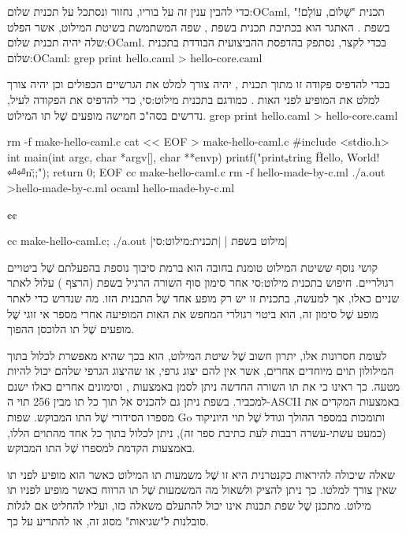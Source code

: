 \begin{טבלא}[!htbp]
כדי להבין ענין זה על בוריו, נחזור ונסתכל על  תכנית שלום:OCaml, תכנית
"שָׁלוֹם, עוֹלָם!" בשפת . האתגר הוא בכתיבת תכנית בשפת , שפה המשתמשת
בשיטת המילוט, אשר הפלט שלה יהיה  תכנית שלום:OCaml. בכדי לקצר, נסתפק בהדפסת
ה הביצועית הבודדת ב תכנית שלום:OCaml{}:
\bash
grep print hello.caml > hello-core.caml
\END
{}
\setLTR
\lstset{language=[Objective]Caml,style=display}

בכדי להדפיס פקודה זו מתוך תכנית , יהיה צורך למלט את הגרשיים הכפולים וכן
יהיה צורך למלט את  המופיע לפני האות .
כמודגם ב תכנית מילוט:סי, כדי להדפיס את הפקודה לעיל, נדרשים בסה"כ חמישה
מופעים שֶׁל תו המילוט.
\bash
grep print hello.caml > hello-core.caml
\END

\bash
rm -f make-hello-caml.c
cat << EOF > make-hello-caml.c
#include <stdio.h>
int main(int argc, char *argv[], char **envp) {
  printf("printₛtring \"Hello, World!⏎⏎n\";;\n");
  return 0;
}
EOF
cc make-hello-caml.c
rm -f hello-made-by-c.ml
./a.out >hello-made-by-c.ml
ocaml hello-made-by-c.ml
\END

{¢¢
\setLTR

}

\bash
cc make-hello-caml.c; ./a.out
\END
{}
\bashStdout
{}|מילוט בשפת |
|תכנית:מילוט:סי|

קושי נוסף ששיטת המילוט טומנת בחובה הוא ברמת סיבוך נוספת בהפעלתם שֶׁל ביטויים
רגולריים. חיפוש ב תכנית מילוט:סי אחר סימון סוף השורה הרגיל בשפת  (הרצף
{\let\ttfamily=\listingsfont\RL{\verb+\n+}}) עלול לאתר שניים כאלו, אך למעשה,
בתכנית זו יש רק מופע אחד שֶׁל התבנית הזו. מה שנדרש כדי לאתר מופע שֶׁל סימון זה,
הוא ביטוי רגולרי המחפש את האות  המופיעה אחרי מספר אי זוגי שֶׁל מופעים שֶׁל
תו הלוכסן ההפוך.

לעומת חסרונות אלו, יתרון חשוב שֶׁל שיטת המילוט, הוא בכך שהיא מאפשרת לכלול
בתוך המילולון תוים מיוחדים אחרים, אשר אין להם יצוג גרפי, או שהיצוג הגרפי
שלהם יכול להיות מטעה. כך ראינו כי את תו השורה החדשה ניתן לסמן באמצעות
{\let\ttfamily=\listingsfont\RL{\verb+\n+}},
וסימונים אחרים כאלו
ישנם למכביר. בשפת  ניתן גם להכניס אל תוך  כל תו מבין 256 תוי
ה-ASCII באמצעות  המקדים את מספרו הסידורי שֶׁל התו המבוקש. שפות
Go ו תומכות במספר ההולך וגודל שֶׁל תוי היוניקוד (כמעט עשתי-עשרה רבבות לעת
כתיבת ספר זה), ניתן לכלול בתוך   כל אחד מהתוים הללו, באמצעות
הקדמת  למספרו שֶׁל התו המבוקש.

שאלה שיכולה להיראות כקנטרנית היא זו שֶׁל משמעות תו המילוט כאשר הוא מופיע לפני תו
שאין צורך למלטו. כך ניתן להציק ולשאול מה המשמעות שֶׁל תו הרווח כאשר מופיע לפניו
תו מילוט. מתכנן שֶׁל שפת תכנות אינו יכול להתעלם משאלה כזו, ועליו להחליט אם לגלות
סובלנות ל"שגיאות" מסוג זה, או להתריע על כך.


\end{טבלא}
